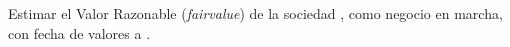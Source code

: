 Estimar el Valor Razonable (\textit{\gls{fairvalue}}) de la sociedad \textcolor{principal}{\bienesValuados}, como negocio en marcha, con fecha de valores a \textcolor{principal}{\fechaValores}.